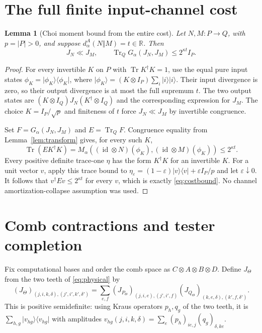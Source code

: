 \documentclass[11pt]{article}
\newcommand{\Tr}{\operatorname{Tr}}
\newcommand{\id}{\operatorname{id}}
\newcommand{\G}{G_\alpha}
\newcommand{\M}{M_\alpha}
\newcommand{\ket}[1]{\lvert #1\rangle}
\newcommand{\bra}[1]{\langle #1\rvert}
\newtheorem{lemma}[theorem]{Lemma}
\theoremstyle{remark}
\begin{document}
\section{The full finite input-channel cost}
\begin{lemma}[Choi moment bound from the entire cost]\label{lem:cost}
Let $N,M:P\to Q$, with $p=|P|>0$, and suppose
$d^A_\alpha(N\Vert M)=t\in\mathbb R$. Then
\begin{equation}\label{eq:costbound}
 J_N\ll J_M,\qquad
 \Tr_Q\G(J_N,J_M)\leq 2^{\kappa t}I_P.
\end{equation}
\end{lemma}
\begin{proof}
For every invertible $K$ on $P$ with $\Tr K^\dagger K=1$, use the equal pure
input states $\phi_K=\ket{\phi_K}\bra{\phi_K}$, where
$\ket{\phi_K}=(K\otimes I_P)\sum_i\ket{i}\ket{i}$. Their input divergence
is zero, so their output divergence is at most the full supremum $t$.
The two output states are
$(K\otimes I_Q)J_N(K^\dagger\otimes I_Q)$ and the corresponding expression
for $J_M$. The choice $K=I_P/\sqrt p$ and finiteness of $t$ force
$J_N\ll J_M$ by invertible congruence.

Set $F=\G(J_N,J_M)$ and $E=\Tr_QF$. Congruence equality from
Lemma~\ref{lem:transform} gives, for every such $K$,
\[
 \Tr(EK^\dagger K)=\M((\id\otimes N)(\phi_K),(\id\otimes M)(\phi_K))
                       \leq2^{\kappa t}.
\]
Every positive definite trace-one $\eta$ has the form $K^\dagger K$ for an
invertible $K$. For a unit vector $v$, apply this trace bound to
$\eta_\varepsilon=(1-\varepsilon)\ket v\bra v+\varepsilon I_P/p$ and
let $\varepsilon\downarrow0$. It follows that
$v^\dagger Ev\leq2^{\kappa t}$ for every $v$, which is exactly
\eqref{eq:costbound}. No channel amortization-collapse assumption was used.
\end{proof}

\section{Comb contractions and tester completion}
Fix computational bases and order the comb space as $C\otimes A\otimes
B\otimes D$. Define $J_\Theta$ from the two teeth of
\eqref{eq:physical} by
\begin{equation}\label{eq:comb}
 (J_\Theta)_{(j,i,k,\delta),(j',i',k',\delta')}
 =\sum_{e,f}
 (J_{P_\Theta})_{(j,i,e),(j',i',f)}
 (J_{Q_\Theta})_{(k,e,\delta),(k',f,\delta')}.
\end{equation}
This is positive semidefinite: using Kraus operators $p_h,q_g$ of the two
teeth, it is $\sum_{h,g}\ket{v_{hg}}\bra{v_{hg}}$ with amplitudes
$v_{hg}(j,i,k,\delta)=\sum_e(p_h)_{i e,j}(q_g)_{\delta,k e}$.
\end{document}

